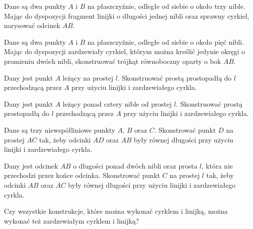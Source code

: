 \begin{problem}
    Dane są dwa punkty $A$ i $B$ na płaszczyźnie, odległe od siebie o około trzy nible.
    Mając do dyspozycji fragment linijki o długości jednej nibli oraz sprawny cyrkiel, narysować odcinek $AB$.
\end{problem}

\begin{problem}
    Dane są dwa punkty $A$ i $B$ na płaszczyźnie, odległe od siebie o około pięć nibli.
    Mając do dyspozycji zardzewiały cyrkiel, którym można kreślić jedynie okręgi o promieniu dwóch nibli, skonstruować trójkąt równoboczny oparty o bok $AB$.
\end{problem}

\begin{problem}
    Dany jest punkt $A$ leżący na prostej $l$.
    Skonstruować prostą prostopadłą do $l$ przechodzącą przez $A$ przy użyciu linijki i zardzewiałego cyrkla.
\end{problem}

\begin{problem}
    Dany jest punkt $A$ leżący ponad cztery nible od prostej $l$.
    Skonstruować prostą prostopadłą do $l$ przechodzącą przez $A$ przy użyciu linijki i zardzewiałego cyrkla.
\end{problem}

\begin{problem}
    Dane są trzy niewspółliniowe punkty $A$, $B$ oraz $C$.
    Skonstrować punkt $D$ na prostej $AC$ tak, żeby odcinki $AD$ oraz $AB$ były równej długości przy użyciu linijki i zardzewiałego cyrkla.
\end{problem}

\begin{problem}
    Dany jest odcinek $AB$ o długości ponad dwóch nibli oraz prosta $l$, która nie przechodzi przez końce odcinka.
    Skonstrować punkt $C$ na prostej $l$ tak, żeby odcinki $AB$ oraz $AC$ były równej długości przy użyciu linijki i zardzewiałego cyrkla.
\end{problem}

\begin{problem}
    Czy wszystkie konstrukcje, które można wykonać cyrklem i linijką, można wykonać też zardzewiałym cyrklem i linijką?
\end{problem}

